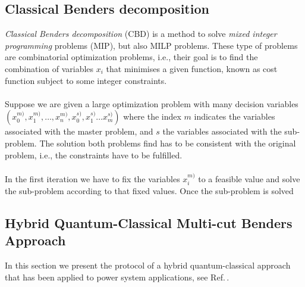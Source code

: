 \subsection{Classical Benders decomposition}
\textit{Classical Benders decomposition} (CBD) is a method to solve \textit{mixed integer programming} problems (MIP), but also MILP problems. These type of problems are combinatorial optimization problems, i.e., their goal is to find the combination of variables $x_{i}$ that minimises a given function, known as cost function subject to some integer constraints.\\\\
Suppose we are given a large optimization problem with many decision variables $\left(x_{0}^{m)}, x_{1}^{m)}, \hdots , x_{n}^{m)}, x_{0}^{s)}, x_{1}^{s)}\hdots x_{m}^{s)}\right)$ where the index $m$ indicates the variables associated with the master problem, and $s$ the variables associated with the sub-problem. The solution both problems find has to be consistent with the original problem, i.e., the constraints have to be fulfilled.\\\\
In the first iteration we have to fix the variables $x_{i}^{m)}$ to a feasible value and solve the sub-problem according to that fixed values. Once the sub-problem is solved
\subsection{Hybrid Quantum-Classical Multi-cut Benders Approach}
In this section we present the protocol of a hybrid quantum-classical approach that has been applied to power system applications, see Ref.\,\cite{Paterakis2021HybridApplication}.\\\\



\newcommand{\keyword}[1]{\textbf{#1}}
\newcommand{\tabhead}[1]{\textbf{#1}}
\newcommand{\code}[1]{\texttt{#1}}
\newcommand{\file}[1]{\texttt{\bfseries#1}}
\newcommand{\option}[1]{\texttt{\itshape#1}}




